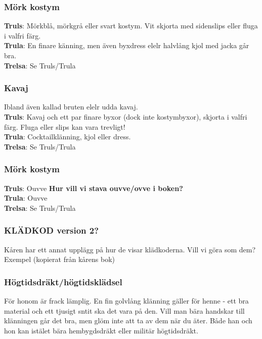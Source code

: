 \subsubsection*{Mörk kostym}
\textbf{Truls}: Mörkblå, mörkgrå eller svart kostym. Vit skjorta med sidenslips eller fluga i valfri färg.\\
\textbf{Trula}: En finare känning, men även byxdress elelr halvlång kjol med jacka går bra.\\
\textbf{Trelsa}: Se Truls/Trula\\

\subsubsection*{Kavaj}
Ibland även kallad bruten elelr udda kavaj.\\
\textbf{Truls}: Kavaj och ett par finare byxor (dock inte kostymbyxor), skjorta i valfri färg. Fluga eller slips kan vara trevligt!\\
\textbf{Trula}: Cocktailklänning, kjol eller dress.\\
\textbf{Trelsa}: Se Truls/Trula\\

\subsubsection*{Mörk kostym}
\textbf{Truls}: Ouvve \textbf{Hur vill vi stava ouvve/ovve i boken?}\\
\textbf{Trula}: Ouvve\\
\textbf{Trelsa}: Se Truls/Trula\\


\subsubsection*{KLÄDKOD version 2?}
Kåren har ett annat upplägg på hur de visar klädkoderna. Vill vi göra som dem?
\\

Exempel (kopierat från kårens bok)

\subsubsection*{Högtidsdräkt/högtidsklädsel}
För honom är frack lämplig. 
En fin golvlång klänning gäller för henne 
- ett bra material och ett tjusigt sntit ska det vara på den. 
Vill man bära handskar till klänningen går det bra, 
men glöm inte att ta av dem när du äter. 
Både han och hon kan istälet bära hembygdsdräkt eller militär högtidsdräkt.


